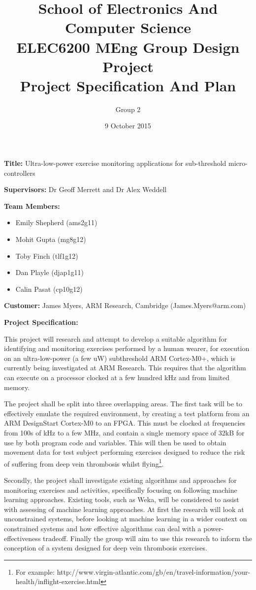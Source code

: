 \documentclass{article}
\title{School of Electronics And Computer Science \\
ELEC6200 MEng Group Design Project \\
Project Specification And Plan}
\author{Group 2}
\date{9 October 2015}
\begin{document}
\maketitle

\textbf{Title:} Ultra-low-power exercise monitoring applications for sub-threshold micro-controllers

\textbf{Supervisors:} Dr Geoff Merrett and Dr Alex Weddell

\textbf{Team Members:}
\begin{itemize}
	\item Emily Shepherd (ams2g11)
	\item Mohit Gupta (mg8g12)
	\item Toby Finch (tlf1g12)
	\item Dan Playle (djap1g11)
	\item Calin Pasat (cp10g12)
\end{itemize}

\textbf{Customer:} James Myers, ARM Research, Cambridge (James.Myers@arm.com)

\textbf{Project Specification:}

This project will research and attempt to develop a suitable algorithm for identifying and
monitoring exercises performed by a human wearer, for execution on an ultra-low-power
(a few uW) subthreshold ARM Cortex-M0+, which is currently being investigated at ARM Research.
This requires that the algorithm can execute on a processor clocked at a few hundred
kHz and from limited memory.

The project shall be split into three overlapping areas. The first task will be to effectively
emulate the required environment, by creating a test platform from an ARM DesignStart Cortex-M0
to an FPGA. This must be clocked at frequencies from 100s of kHz to a few MHz, and contain a
single memory space of 32kB for use by both program code and variables. This will then be used to
obtain movement data for test subject performing exercises designed to reduce the risk of suffering from
deep vein thrombosis whilst flying\footnote{For example:
http://www.virgin-atlantic.com/gb/en/travel-information/your-health/inflight-exercise.html}.

Secondly, the project shall investigate existing algorithms and approaches for monitoring
exercises and activities, specifically focusing on following machine learning
approaches. Existing tools, such as Weka, will be considered to assist with assessing of machine learning approaches. At first the research will look at unconstrained systems, before looking at
machine learning in a wider context on constrained systems and how effective algorithms can
deal with a power-effectiveness tradeoff. Finally the group will aim to use this research
to inform the conception of a system designed for deep vein thrombosis exercises.
\end{document}
